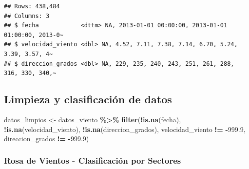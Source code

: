\documentclass[
]{article}
\newenvironment{Shaded}{\begin{snugshade}}{\end{snugshade}}
\newcommand{\FloatTok}[1]{\textcolor[rgb]{0.00,0.00,0.81}{#1}}
\newcommand{\FunctionTok}[1]{\textcolor[rgb]{0.13,0.29,0.53}{\textbf{#1}}}
\newcommand{\NormalTok}[1]{#1}
\newcommand{\OtherTok}[1]{\textcolor[rgb]{0.56,0.35,0.01}{#1}}
\newcommand{\SpecialCharTok}[1]{\textcolor[rgb]{0.81,0.36,0.00}{\textbf{#1}}}
\begin{document}
\begin{verbatim}
## Rows: 438,484
## Columns: 3
## $ fecha            <dttm> NA, 2013-01-01 00:00:00, 2013-01-01 01:00:00, 2013-0~
## $ velocidad_viento <dbl> NA, 4.52, 7.11, 7.38, 7.14, 6.70, 5.24, 3.39, 3.57, 4~
## $ direccion_grados <dbl> NA, 229, 235, 240, 243, 251, 261, 288, 316, 330, 340,~
\end{verbatim}

\subsection{Limpieza y clasificación de datos}\label{limpieza-y-clasificaciuxf3n-de-datos}

\begin{Shaded}
\begin{Highlighting}[]
\NormalTok{datos\_limpios }\OtherTok{\textless{}{-}}\NormalTok{ datos\_viento }\SpecialCharTok{\%\textgreater{}\%}
    \FunctionTok{filter}\NormalTok{(}\SpecialCharTok{!}\FunctionTok{is.na}\NormalTok{(fecha), }\SpecialCharTok{!}\FunctionTok{is.na}\NormalTok{(velocidad\_viento),}
        \SpecialCharTok{!}\FunctionTok{is.na}\NormalTok{(direccion\_grados), velocidad\_viento }\SpecialCharTok{!=}
            \SpecialCharTok{{-}}\FloatTok{999.9}\NormalTok{, direccion\_grados }\SpecialCharTok{!=} \SpecialCharTok{{-}}\FloatTok{999.9}\NormalTok{)}
\end{Highlighting}
\end{Shaded}

\subsubsection{Rosa de Vientos - Clasificación por Sectores}\label{rosa-de-vientos---clasificaciuxf3n-por-sectores}
\end{document}
